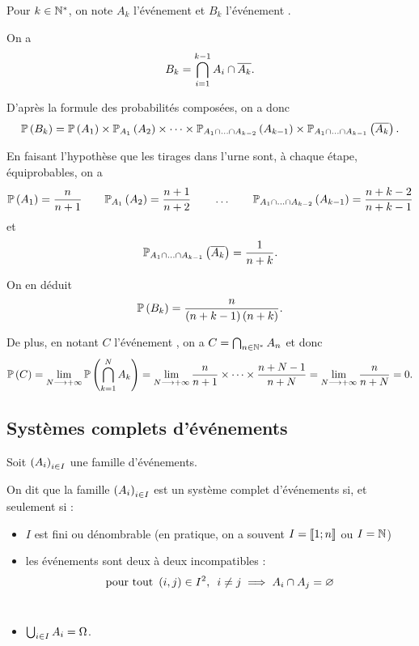 \begin{corr}
Pour \(k\in\mathbb{N}^*\), on note \(A_k\) l'événement  et \(B_k\) l'événement .

On a \[B_k=\bigcap_{i=1}^{k-1}A_i\cap\overline{A_k}.\]

D'après la formule des probabilités composées, on a donc \[\proba{B_k}=\proba{A_1}\times\probacond{A_2}{A_1}\times\dots\times\probacond{A_{k-1}}{A_1\inter\dots\inter A_{k-2}}\times\probacond{\conj{A_k}}{A_1\inter\dots\inter A_{k-1}}.\]

En faisant l'hypothèse que les tirages dans l'urne sont, à chaque étape, équiprobables, on a \[\proba{A_1}=\dfrac{n}{n+1}\qquad\probacond{A_2}{A_1}=\dfrac{n+1}{n+2}\qquad\dots\qquad\probacond{A_{k-1}}{A_1\inter\dots\inter A_{k-2}}=\dfrac{n+k-2}{n+k-1}\] et \[\probacond{\conj{A_k}}{A_1\inter\dots\inter A_{k-1}}=\dfrac{1}{n+k}.\]

On en déduit \[\mathbb{P}\left(B_k\right)=\dfrac{n}{\left(n+k-1\right)\left(n+k\right)}.\]

De plus, en notant \(C\) l'événement , on a \(C=\bigcap_{n\in\mathbb{N}^*}A_n\) et donc \[\mathbb{P}\left(C\right)=\lim_{N\longrightarrow+\infty}\mathbb{P}\left(\bigcap_{k=1}^NA_k\right)=\lim_{N\longrightarrow+\infty}\dfrac{n}{n+1}\times\dots\times\dfrac{n+N-1}{n+N}=\lim_{N\longrightarrow+\infty}\dfrac{n}{n+N}=0.\]
\end{corr}

\subsection{Systèmes complets d'événements}

\begin{defi}
Soit \(\left(A_i\right)_{i\in I}\) une famille d'événements.

On dit que la famille \(\left(A_i\right)_{i\in I}\) est un système complet d'événements si, et seulement si :

\begin{itemize}
    \item \(I\) est fini ou dénombrable (en pratique, on a souvent \(I=\left\llbracket1;n\right\rrbracket\) ou \(I=\mathbb{N}\)) \\
    \item les événements sont deux à deux incompatibles : \[\quantifs{\tpt\paren{i,j}\in I^2}i\not=j\imp A_i\inter A_j=\ensvide\] \\
    \item \(\bigcup_{i\in I}A_i=\Omega\).
\end{itemize}
\end{defi}

